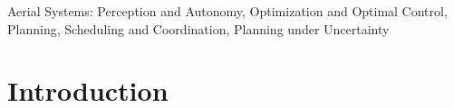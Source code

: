 \documentclass[letterpaper,10pt,journal,twoside]{IEEEtran}
\theoremstyle{definition}
\begin{document}
\begin{IEEEkeywords}
  Aerial Systems: Perception and Autonomy, Optimization and Optimal Control, Planning, Scheduling and Coordination, Planning under Uncertainty
\end{IEEEkeywords}

%
\IEEEpeerreviewmaketitle


\section{Introduction}  %
\label{sec:intro}       %
\end{document}
